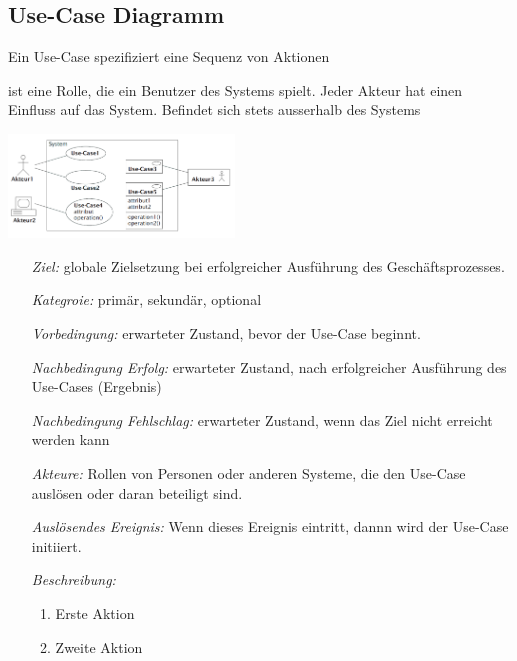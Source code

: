 \subsection{Use-Case Diagramm }
	Ein Use-Case spezifiziert eine Sequenz von Aktionen
	\begin{description}[leftmargin=2.5cm]
		\item[Akteur]
      \parbox{7cm}{
        ist eine Rolle, die ein Benutzer des Systems spielt. Jeder Akteur hat einen 
        Einfluss auf das System. Befindet sich stets ausserhalb des Systems}
      \hspace{0.5cm}
      \parbox{6cm}{\includegraphics[width=6cm]{./bilder/UseCase_Notation.png}}
    \item[Schablone \Balzert{68}]
      \begin{itemize}[leftmargin=4cm]
        \item[\textit{Ziel:}]
          globale Zielsetzung bei erfolgreicher Ausführung des Geschäftsprozesses.
        \item[\textit{Kategroie:}]
          primär, sekundär, optional
        \item[\textit{Vorbedingung:}]
          erwarteter Zustand, bevor der Use-Case beginnt.
        \item[\textit{Nachbedingung Erfolg:}]
          erwarteter Zustand, nach erfolgreicher Ausführung des Use-Cases (Ergebnis)
        \item[\textit{Nachbedingung Fehlschlag:}]
          erwarteter Zustand, wenn das Ziel nicht erreicht werden kann
        \item[\textit{Akteure:}]
          Rollen von Personen oder anderen Systeme, die den Use-Case auslösen
          oder daran beteiligt sind.
        \item[\textit{Auslösendes Ereignis:}]
          Wenn dieses Ereignis eintritt, dannn wird der Use-Case initiiert.
        \item[\textit{Beschreibung:}]
          \begin{enumerate}[leftmargin=0.5cm]
            \item Erste Aktion
            \item Zweite Aktion
          \end{enumerate}

\end{itemize}
\end{description}
